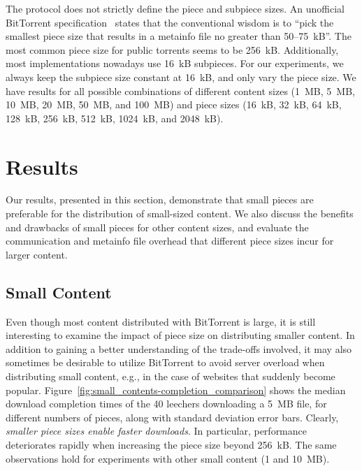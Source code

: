 \documentclass[twocolumn,letterpaper,11pt]{article}
\begin{document}
The protocol does not strictly define the piece and subpiece sizes.
An unofficial BitTorrent specification~\cite{btwikispec} states that the 
conventional wisdom is to ``pick the smallest piece size that results in a metainfo file 
no greater than 50--75~kB''. The most common piece size for public torrents seems to be 256~kB.
Additionally, most implementations nowadays use 16~kB subpieces.
For our experiments, we always keep the subpiece size constant at 16~kB, and
only vary the piece size. We have results for all possible 
combinations of different content sizes (1~MB, 5~MB, 10~MB, 20~MB, 50~MB, and 100~MB) 
and piece sizes 
(16~kB, 32~kB, 64~kB, 128~kB, 256~kB, 512~kB, 1024~kB, and 2048~kB).


\section{Results}
\label{sec:results}

Our results, presented in this section, demonstrate that small pieces are preferable for the 
distribution of
small-sized content. We also discuss the benefits and drawbacks of small
pieces for other content sizes, and evaluate the communication and
metainfo file overhead that different piece sizes incur for larger content.

\subsection{Small Content}

Even though most content distributed with BitTorrent is large, it is still interesting to examine the impact
of piece size on distributing smaller content. In addition to gaining a better understanding of the 
trade-offs involved, it may also sometimes be desirable to utilize BitTorrent to avoid server overload when 
distributing small content, e.g., in the case of websites that suddenly become popular.
Figure~\ref{fig:small_contents-completion_comparison} shows the median download 
completion times of the 40 leechers downloading a 5~MB file, for
different numbers of pieces, along with standard deviation error bars.
Clearly, \emph{smaller piece sizes enable faster downloads}.
In particular, performance deteriorates rapidly when increasing the piece size
beyond 256~kB.
The same observations hold for experiments with other small content
(1 and 10~MB).
\end{document}
